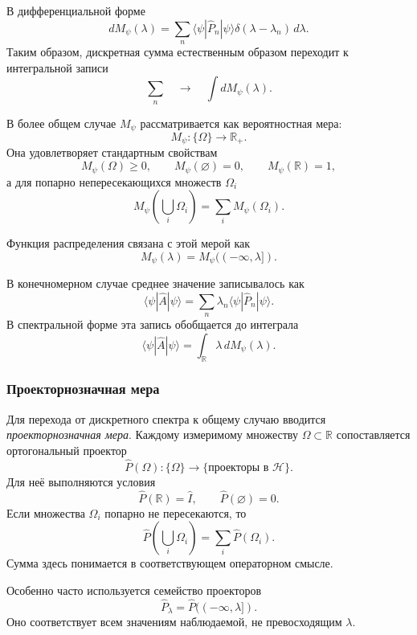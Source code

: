 \documentclass[12pt,a4paper]{article}
\begin{document}
В дифференциальной форме
\[
    \boxed{
    dM_\psi(\lambda)
    =
    \sum_n
        \langle\psi|\hat P_n|\psi\rangle
        \delta(\lambda-\lambda_n)\,d\lambda
    }.
\]
Таким образом, дискретная сумма естественным образом переходит к
интегральной записи
\[
    \sum_n
    \quad\longrightarrow\quad
    \int dM_\psi(\lambda).
\]

В более общем случае $M_\psi$ рассматривается как вероятностная мера:
\[
    M_\psi:\{\Omega\}\to\mathbb R_+.
\]
Она удовлетворяет стандартным свойствам
\[
    M_\psi(\Omega)\geq0,
    \qquad
    M_\psi(\varnothing)=0,
    \qquad
    M_\psi(\mathbb R)=1,
\]
а для попарно непересекающихся множеств $\Omega_i$
\[
    \boxed{
    M_\psi
    \left(
        \bigcup_i\Omega_i
    \right)
    =
    \sum_i
        M_\psi(\Omega_i)
    }.
\]

Функция распределения связана с этой мерой как
\[
    M_\psi(\lambda)
    =
    M_\psi((-\infty,\lambda]).
\]

В конечномерном случае среднее значение записывалось как
\[
    \langle\psi|\hat A|\psi\rangle
    =
    \sum_n
        \lambda_n
        \langle\psi|\hat P_n|\psi\rangle.
\]
В спектральной форме эта запись обобщается до интеграла
\[
    \boxed{
    \langle\psi|\hat A|\psi\rangle
    =
    \int_{\mathbb R}
        \lambda\,dM_\psi(\lambda)
    }.
\]

\subsubsection{Проекторнозначная мера}

Для перехода от дискретного спектра к общему случаю вводится
\emph{проекторнозначная мера}. Каждому измеримому множеству
$\Omega\subset\mathbb R$ сопоставляется ортогональный проектор
\[
    \boxed{
        \hat P(\Omega):\{\Omega\}\longrightarrow
        \{\text{проекторы в }\mathcal H\}
    }.
\]
Для неё выполняются условия
\[
    \boxed{
        \hat P(\mathbb R)=\hat I,
        \qquad
        \hat P(\varnothing)=0
    }.
\]
Если множества $\Omega_i$ попарно не пересекаются, то
\[
    \boxed{
        \hat P\left(\bigcup_i\Omega_i\right)
        =
        \sum_i\hat P(\Omega_i)
    }.
\]
Сумма здесь понимается в соответствующем операторном смысле.

Особенно часто используется семейство проекторов
\[
    \boxed{
        \hat P_\lambda
        =
        \hat P((-\infty,\lambda])
    }.
\]
Оно соответствует всем значениям наблюдаемой, не превосходящим
$\lambda$.
\end{document}
